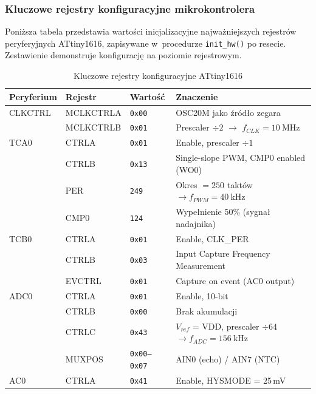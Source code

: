 \documentclass[a4paper,11pt]{article}
\begin{document}
	\subsubsection{Kluczowe rejestry konfiguracyjne mikrokontrolera}
	\label{sec:rejestry}
	
	Poniższa tabela przedstawia wartości inicjalizacyjne najważniejszych
	rejestrów peryferyjnych ATtiny1616, zapisywane w~procedurze \texttt{init\_hw()}
	po resecie. Zestawienie demonstruje konfigurację na poziomie rejestrowym.
	
	\begin{table}[H]
		\centering
		\caption{Kluczowe rejestry konfiguracyjne ATtiny1616}
		\label{tab:rejestry}
		\footnotesize
		\begin{tabularx}{\textwidth}{l l l X}
			\toprule
			\textbf{Peryferium} & \textbf{Rejestr} & \textbf{Wartość} & \textbf{Znaczenie} \\
			\midrule
			CLKCTRL & MCLKCTRLA   & \texttt{0x00}  & OSC20M jako źródło zegara \\
			& MCLKCTRLB   & \texttt{0x01}  & Prescaler $\div 2$ $\to$ $f_{CLK} = \SI{10}{\mega\hertz}$ \\
			\midrule
			TCA0    & CTRLA       & \texttt{0x01}  & Enable, prescaler $\div 1$ \\
			& CTRLB       & \texttt{0x13}  & Single-slope PWM, CMP0 enabled (WO0) \\
			& PER         & \texttt{249}   & Okres $= 250$ taktów $\to f_{PWM} = \SI{40}{\kilo\hertz}$ \\
			& CMP0        & \texttt{124}   & Wypełnienie 50\% (sygnał nadajnika) \\
			\midrule
			TCB0    & CTRLA       & \texttt{0x01}  & Enable, CLK\_PER \\
			& CTRLB       & \texttt{0x03}  & Input Capture Frequency Measurement \\
			& EVCTRL      & \texttt{0x01}  & Capture on event (AC0 output) \\
			\midrule
			ADC0    & CTRLA       & \texttt{0x01}  & Enable, 10-bit \\
			& CTRLB       & \texttt{0x00}  & Brak akumulacji \\
			& CTRLC       & \texttt{0x43}  & $V_{ref}$ = VDD, prescaler $\div 64$ $\to f_{ADC} = \SI{156}{\kilo\hertz}$ \\
			& MUXPOS      & \texttt{0x00--0x07} & AIN0 (echo) / AIN7 (NTC) \\
			\midrule
			AC0     & CTRLA       & \texttt{0x41}  & Enable, HYSMODE = 25\,mV \\

\end{tabularx}
\end{table}
\end{document}
